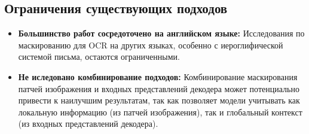 \subsection{Ограничения  существующих  подходов}

\begin{itemize}
    \item \textbf{Большинство  работ  сосредоточено  на  английском  языке:}  Исследования  по  маскированию  для  OCR  на  других  языках,  особенно  с  иероглифической  системой  письма,  остаются  ограниченными.
    \item \textbf{Не иследовано комбинирование подходов:}  Комбинирование  маскирования  патчей  изображения  и  входных  представлений  декодера может потенциально  привести  к  наилучшим  результатам,  так  как  позволяет  модели  учитывать  как  локальную  информацию  (из  патчей  изображения),  так  и  глобальный  контекст  (из  входных  представлений  декодера).
\end{itemize}

\newpage
